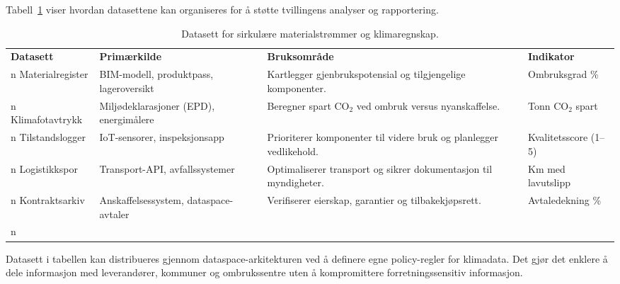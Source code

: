 Tabell~\ref{tab:kap03-sirkular-data} viser hvordan datasettene kan organiseres for å støtte tvillingens analyser og rapportering.

\begin{table}[ht]
    \centering
    \caption{Datasett for sirkulære materialstrømmer og klimaregnskap.}
    \label{tab:kap03-sirkular-data}
    \begin{tabular}{p{}p{}p{}p{}}
        \toprule
        \textbf{Datasett} & \textbf{Primærkilde} & \textbf{Bruksområde} & \textbf{Indikator} \\n        \midrule
        Materialregister & BIM-modell, produktpass, lageroversikt & Kartlegger gjenbrukspotensial og tilgjengelige komponenter. & Ombruksgrad \% \\n        Klimafotavtrykk & Miljødeklarasjoner (EPD), energimålere & Beregner spart CO$_2$ ved ombruk versus nyanskaffelse. & Tonn CO$_2$ spart \\n        Tilstandslogger & IoT-sensorer, inspeksjonsapp & Prioriterer komponenter til videre bruk og planlegger vedlikehold. & Kvalitetsscore (1--5) \\n        Logistikkspor & Transport-API, avfallssystemer & Optimaliserer transport og sikrer dokumentasjon til myndigheter. & Km med lavutslipp \\n        Kontraktsarkiv & Anskaffelsessystem, dataspace-avtaler & Verifiserer eierskap, garantier og tilbakekjøpsrett. & Avtaledekning \% \\n        \bottomrule
    \end{tabular}
\end{table}

Datasett i tabellen kan distribueres gjennom dataspace-arkitekturen ved å definere egne policy-regler for klimadata. Det gjør det enklere å
dele informasjon med leverandører, kommuner og ombrukssentre uten å kompromittere forretningssensitiv informasjon.

